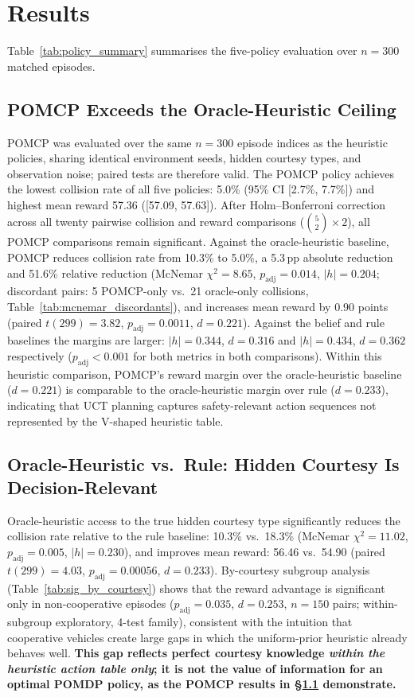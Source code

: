 \section{Results}
\label{sec:results}

Table~\ref{tab:policy_summary} summarises the five-policy evaluation over
$n{=}300$ matched episodes.

\subsection{POMCP Exceeds the Oracle-Heuristic Ceiling}
\label{sec:results_pomcp}
POMCP was evaluated over the same $n{=}300$ episode indices as the heuristic
policies, sharing identical environment seeds, hidden courtesy types, and
observation noise; paired tests are therefore valid.
The POMCP policy achieves the lowest collision rate of all five policies:
5.0\% (95\% CI [2.7\%, 7.7\%]) and highest mean reward 57.36
([57.09, 57.63]).
After Holm--Bonferroni correction across all twenty pairwise collision and
reward comparisons ($\binom{5}{2}{\times}2$), all POMCP comparisons remain
significant.
Against the oracle-heuristic baseline, POMCP reduces collision rate from
10.3\% to 5.0\%, a 5.3\,pp absolute reduction and 51.6\% relative reduction
(McNemar $\chi^2{=}8.65$, $p_\text{adj}{=}0.014$, $|h|{=}0.204$;
discordant pairs: 5 POMCP-only vs.\ 21 oracle-only collisions,
Table~\ref{tab:mcnemar_discordants}), and increases mean reward by 0.90 points (paired
$t(299){=}3.82$, $p_\text{adj}{=}0.0011$, $d{=}0.221$).
Against the belief and rule baselines the margins are larger:
$|h|{=}0.344$, $d{=}0.316$ and $|h|{=}0.434$, $d{=}0.362$ respectively
($p_\text{adj}{<}0.001$ for both metrics in both comparisons).
Within this heuristic comparison, POMCP's reward margin over the
oracle-heuristic baseline ($d{=}0.221$) is comparable to the
oracle-heuristic margin over rule ($d{=}0.233$), indicating that UCT planning
captures safety-relevant action sequences not represented by the V-shaped
heuristic table.

\subsection{Oracle-Heuristic vs.\ Rule: Hidden Courtesy Is Decision-Relevant}
\label{sec:results_oracle}
Oracle-heuristic access to the true hidden courtesy type significantly
reduces the collision rate relative to the rule baseline:
10.3\% vs.\ 18.3\%
(McNemar $\chi^2{=}11.02$, $p_\text{adj}{=}0.005$, $|h|{=}0.230$),
and improves mean reward:
56.46 vs.\ 54.90
(paired $t(299){=}4.03$, $p_\text{adj}{=}0.00056$, $d{=}0.233$).
By-courtesy subgroup analysis (Table~\ref{tab:sig_by_courtesy}) shows that
the reward advantage is significant only in non-cooperative episodes
($p_\text{adj}{=}0.035$, $d{=}0.253$, $n{=}150$ pairs; within-subgroup exploratory, 4-test family), consistent with
the intuition that cooperative vehicles create large gaps in which the
uniform-prior heuristic already behaves well.
\textbf{This gap reflects perfect courtesy knowledge \emph{within the heuristic
action table only}; it is not the value of information for an optimal POMDP
policy, as the POMCP results in \S\ref{sec:results_pomcp} demonstrate.}

